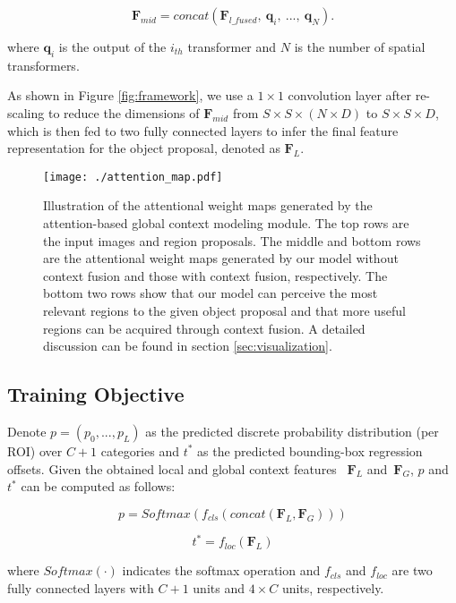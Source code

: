 \documentclass[journal]{IEEEtran}
\begin{document}
\begin{equation}
	\bm{F}_{mid} = concat(\bm{F}_{l\_fused}, \ \bm{q}_i, \ ..., \ \bm{q}_N).
\end{equation}

where $\bm{q}_i$ is the output of the $i_{th}$ transformer and $N$ is the number of spatial transformers.

As shown in Figure \ref{fig:framework}, we use a $1 \times 1$ convolution layer after re-scaling to reduce the dimensions of $\bm{F}_{mid}$ from $S \times S \times (N \times D)$ to $S \times S \times D$, which is then fed to two fully connected layers to infer the final feature representation for the object proposal, denoted as $\bm{F}_L$.

\begin{figure*}
\centering
  \texttt{[image: ./attention\_map.pdf]}
  \caption{Illustration of the attentional weight maps generated by the attention-based global context modeling module. The top rows are the input images and region proposals. The middle and bottom rows are  the attentional weight maps generated by our model without context fusion and those with context fusion, respectively. The bottom two rows show that our model can perceive the most relevant regions to the given object proposal and that more useful regions can be acquired through context fusion. A detailed discussion can be found in section \ref{sec:visualization}.}
\label{fig:detection maps}
\end{figure*}


\subsection{Training Objective}
Denote $p = (p_0,...,p_L)$ as the predicted discrete probability distribution (per ROI) over $C+1$ categories and $t^*$ as the predicted bounding-box regression offsets. Given the obtained local and global context features ~$\bm{F}_L$ and~$\bm{F}_G$, $p$ and $t^*$ can be computed as follows:

\begin{equation}
	p = \textit{Softmax} \left( \textit{$f_{cls}$} \left( concat(\bm{F}_L, \bm{F}_G) \right) \right)
\end{equation}

\begin{equation}
	t^* = \textit{$f_{loc}$} \left( \bm{F}_L \right)
\end{equation}

where $Softmax(\cdot)$ indicates the softmax operation and $f_{cls}$ and $f_{loc}$ are two fully connected layers with $C+1$ units and $4 \times C$ units, respectively.
\end{document}
